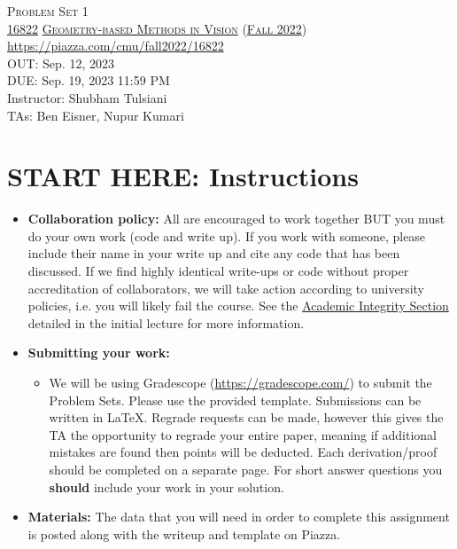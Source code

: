 \documentclass[11pt,addpoints,answers]{exam}
\title{\textsc{\hwName}} %
\author{}
\date{}
\date{}
\numberwithin{equation}{section} %
\numberwithin{figure}{section} %
\numberwithin{table}{section} %
\newcommand{\courseNum}{\href{https://geometric3d.github.io}{16822}}
\newcommand{\courseName}{\href{https://geometric3d.github.io}{Geometry-based Methods in Vision}}
\newcommand{\courseSem}{\href{https://geometric3d.github.io}{Fall 2022}}
\newcommand{\courseUrl}{\url{https://piazza.com/cmu/fall2022/16822}}
\newcommand{\hwNum}{Problem Set 1}
\newcommand{\hwTopic}{Projective Geometry and Homography }
\newcommand{\outDate}{Sep. 12, 2023}
\newcommand{\dueDate}{Sep. 19, 2023 11:59 PM}
\newcommand{\instructorName}{Shubham Tulsiani}
\newcommand{\taNames}{Ben Eisner, Nupur Kumari}
\begin{document}
\section*{}
\begin{center}
  \textsc{\LARGE \hwNum} \\
  \vspace{1em}
  \textsc{\large \courseNum{} \courseName{} (\courseSem)} \\
  \courseUrl\\
  \vspace{1em}
  OUT: \outDate \\
  DUE: \dueDate \\
  Instructor: \instructorName \\
  TAs: \taNames
\end{center}

\section*{START HERE: Instructions}
\begin{itemize}
\item \textbf{Collaboration policy:} All are encouraged to work together BUT you must do your own work (code and write up). If you work with someone, please include their name in your write up and cite any code that has been discussed. If we find highly identical write-ups or code without proper accreditation of collaborators, we will take action according to university policies, i.e. you will likely fail the course. See the \href{https://www.dropbox.com/s/z6o0tinc9eaez46/L01_Overview.pdf?dl=0}{Academic Integrity Section} detailed in the initial lecture for more information.


\item\textbf{Submitting your work:}

\begin{itemize}

\item We will be using Gradescope (\url{https://gradescope.com/}) to submit the Problem Sets. Please use the provided template. Submissions can be written in LaTeX. Regrade requests can be made, however this gives the TA the opportunity to regrade your entire paper, meaning if additional mistakes are found then points will be deducted.
Each derivation/proof should be  completed on a separate page. For short answer questions you \textbf{should} include your work in your solution.  
\end{itemize}

\item \textbf{Materials:} The data that you will need in order to complete this assignment is posted along with the writeup and template on Piazza.

\end{itemize}
\end{document}
